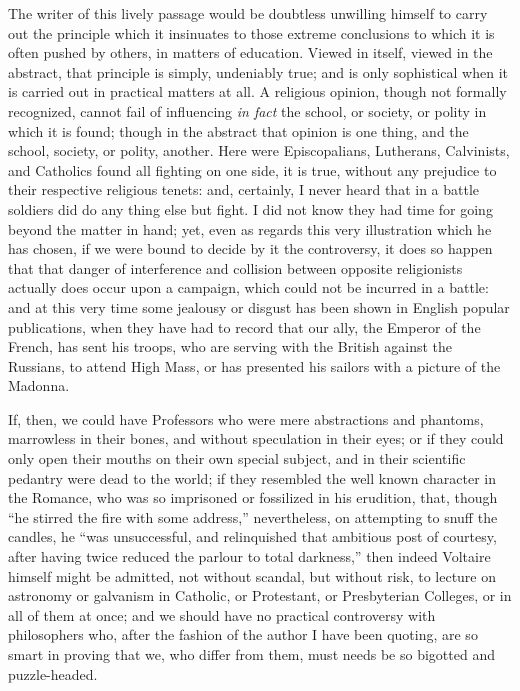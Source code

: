 The writer of this lively passage would be doubtless unwilling
himself to carry out the principle which it insinuates to those
extreme conclusions to which it is often pushed by others, in matters
of education. Viewed in itself, viewed in the abstract, that principle
is simply, undeniably true; and is only sophistical when it is carried
out in practical matters at all. A religious opinion, though not
formally recognized, cannot fail of influencing \emph{in fact} the
school, or society, or polity in which it is found; though in the
abstract that opinion is one thing, and the school, society, or
polity, another. Here were Episcopalians, Lutherans, Calvinists, and
Catholics found all fighting on one side, it is true, without any
prejudice to their respective religious tenets: and, certainly, I
never heard that in a battle soldiers did do any thing else but fight.
I did not know they had time for going beyond the matter in hand; yet,
even as regards this very illustration which he has chosen, if we were
bound to decide by it the controversy, it does so happen that that
danger of interference and collision between opposite religionists
actually does occur upon a campaign, which could not be incurred in a
battle: and at this very time some jealousy or disgust has been shown
in English popular publications, when they have had to record that our
ally, the Emperor of the French, has sent his troops, who are serving
with the British against the Russians, to attend High Mass, or
has presented his sailors with a picture of the Madonna.

If, then, we could have Professors who were mere abstractions and
phantoms, marrowless in their bones, and without speculation in their
eyes; or if they could only open their mouths on their own special
subject, and in their scientific pedantry were dead to the world; if
they resembled the well known character in the Romance, who was so
imprisoned or fossilized in his erudition, that, though ``he
stirred the fire with some address,'' nevertheless, on attempting
to snuff the candles, he ``was unsuccessful, and relinquished that
ambitious post of courtesy, after having twice reduced the parlour to
total darkness,'' then indeed Voltaire himself might be admitted,
not without scandal, but without risk, to lecture on astronomy or
galvanism in Catholic, or Protestant, or Presbyterian Colleges, or in
all of them at once; and we should have no practical controversy with
philosophers who, after the fashion of the author I have been quoting,
are so smart in proving that we, who differ from them, must needs be
so bigotted and puzzle-headed.

